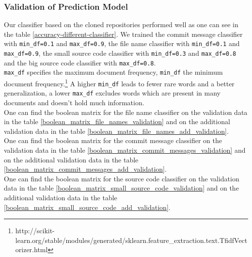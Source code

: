 \documentclass[%
a4paper,
DIV12,
2.5headlines,
bigheadings,
titlepage,
openbib,
]{scrartcl}
\begin{document}
\subsubsection{Validation of Prediction
Model}\label{validation-of-prediction-model-2}

Our classifier based on the cloned repositories performed well as one can see in the table \ref{accuracy-different-classifier}.
We trained the commit message classifier with \texttt{min\_df=0.1} and \texttt{max\_df=0.9}, the file name classifier with \texttt{min\_df=0.1} and \texttt{max\_df=0.9}, the small source code classifier with \texttt{min\_df=0.3} and \texttt{max\_df=0.8} and the big source code classifier with \texttt{max\_df=0.8}.\\
\texttt{max\_df} specifies the maximum document frequency, \texttt{min\_df} the minimum document frequency.\footnote{http://scikit-learn.org/stable/modules/generated/sklearn.feature\_extraction.text.TfidfVectorizer.html}
A higher \texttt{min\_df} leads to fewer rare words and a better generalization, a lower \texttt{max\_df} excludes words which are present in many documents and doesn't hold much information.\\

One can find the boolean matrix for the file name classifier on the validation data in the table \ref{boolean_matrix_file_names_validation} and on the additional validation data in the table \ref{boolean_matrix_file_names_add_validation}.\\
One can find the boolean matrix for the commit message classifier on the validation data in the table \ref{boolean_matrix_commit_messages_validation} and on the additional validation data in the table \ref{boolean_matrix_commit_messages_add_validation}.\\
One can find the boolean matrix for the source code classifier on the validation data in the table \ref{boolean_matrix_small_source_code_validation} and on the additional validation data in the table \ref{boolean_matrix_small_source_code_add_validation}.\\
\end{document}
